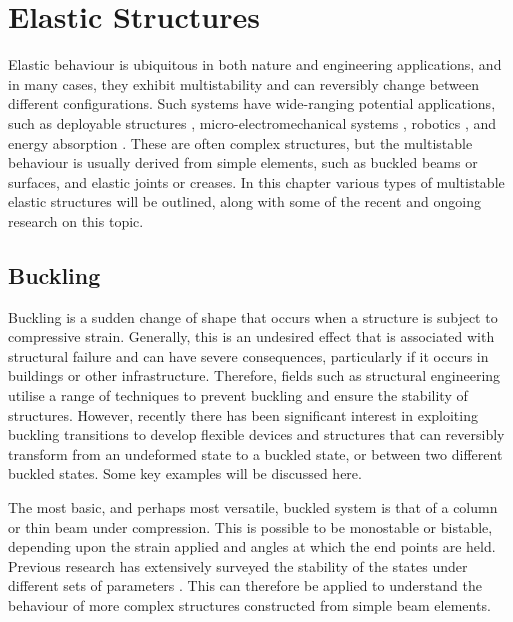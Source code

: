 \chapter{Elastic Structures}
\label{ch:elastic_structures}
\graphicspath{{elastic_structures/fig/}}

Elastic behaviour is ubiquitous in both nature and engineering applications, and in many cases, they exhibit multistability and can reversibly change between different configurations.
Such systems have wide-ranging potential applications, such as deployable structures \cite{Filipov2015,Zhai2018,Zareei2020}, micro-electromechanical systems \cite{Felton2014,Ko2017}, robotics \cite{Kwok2014,Chen2018a,Gorissen2020,Currier2020,Tang2020}, and energy absorption \cite{Shan2015,Bertoldi2017a}.
These are often complex structures, but the multistable behaviour is usually derived from simple elements, such as buckled beams or surfaces, and elastic joints or creases.
In this chapter various types of multistable elastic structures will be outlined, along with some of the recent and ongoing research on this topic.



\section{Buckling}
Buckling is a sudden change of shape that occurs when a structure is subject to compressive strain.
Generally, this is an undesired effect that is associated with structural failure and can have severe consequences, particularly if it occurs in buildings or other infrastructure.
Therefore, fields such as structural engineering utilise a range of techniques to prevent buckling and ensure the stability of structures.
However, recently there has been significant interest in exploiting buckling transitions to develop flexible devices and structures that can reversibly transform from an undeformed state to a buckled state, or between two different buckled states.
Some key examples will be discussed here.

The most basic, and perhaps most versatile, buckled system is that of a column or thin beam under compression.
This is possible to be monostable or bistable, depending upon the strain applied and angles at which the end points are held.
Previous research has extensively surveyed the stability of the states under different sets of parameters \cite{Wan2020}.
This can therefore be applied to understand the behaviour of more complex structures constructed from simple beam elements.

